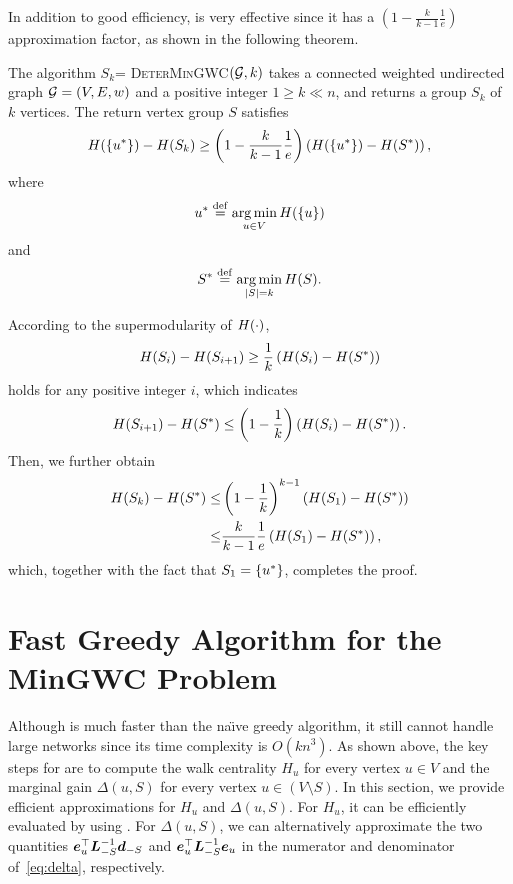 \documentclass[10pt,twocolumn,twoside]{IEEEtran}
\begin{document}
In addition to good efficiency,  is very effective since it has a $(1-\frac{k}{k-1}\frac{1}{e})$ approximation factor, as shown in the following theorem.
\begin{theorem}
    The algorithm $S_k$= \textsc {DeterMinGWC}$ (\mathcal{G},k)$ takes a connected weighted undirected graph \(\mathcal{G}=(V,E,w)\) and a positive integer \(1 \geq k \ll n\), and returns a  group \(S_k\) of \(k\) vertices.
    The return vertex group \(S\) satisfies
    \[H(\left\{u^* \right\})-H(S_k)\ge\left( 1-\frac{k}{k-1}\frac{1}{e} \right)\left( H(\left\{u^* \right\})-H(S^*) \right),\]
    where
    \[u^*\stackrel{\mathrm{def}}{=}\operatorname*{arg\,min}_{u\in V}H(\left\{u \right\})\] and \[S^*\stackrel{\mathrm{def}}{=}\operatorname*{arg\,min}_{\left|S \right|=k}H(S).\]
\end{theorem}
\begin{IEEEproof}
    According to the supermodularity of \(H(\cdot)\),
    \[H(S_i)-H(S_{i+1})\ge\frac{1}{k}\left( H(S_i)-H(S^*) \right)\]
    holds for any positive integer \(i\), which indicates
    \[H(S_{i+1})-H(S^*)\le\left( 1-\frac{1}{k} \right)\left( H(S_i)-H(S^*) \right).\]
    Then, we  further obtain
    \begin{align*}
        H(S_k)-H(S^*)\le & \left( 1-\frac{1}{k} \right)^{k-1}\left( H(S_1)-H(S^*) \right) \\
        \le                      & \frac{k}{k-1}\frac{1}{e}\left( H(S_1)-H(S^*) \right),
    \end{align*}
    which, together with the fact that \(S_1=\left\{u^* \right\}\), completes the proof.
\end{IEEEproof}

\section{Fast Greedy Algorithm for the MinGWC Problem}\label{sec:approx-algo2}

Although  is much faster than the  na\"{\i}ve greedy  algorithm, it  still cannot handle  large networks since its time complexity is  \(O(kn^3)\). As shown above, the key steps for  are  to compute the walk centrality $H_u$ for every vertex $u \in V$ and the marginal gain  \(\Delta(u,S)\) for every vertex $u \in (V \setminus S)$. In this section, we provide efficient approximations for  $H_u$ and \(\Delta(u,S)\). For $H_u$, it can be efficiently evaluated by using . For \(\Delta(u,S)\), we can alternatively approximate the two quantities  $\boldsymbol{e}_u^\top \boldsymbol{L}_{-S}^{-1} \boldsymbol{d}_{-S}$ and $\boldsymbol{e}_u^\top \boldsymbol{L}_{-S}^{-1}\boldsymbol{e}_u$ in the numerator and denominator of~\eqref{eq:delta}, respectively.
\end{document}

